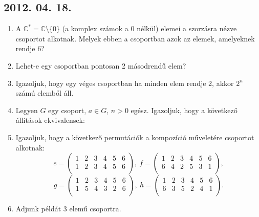 \subsection*{2012. 04. 18.}
\begin{enumerate}
\item A $\mathbb{C}^{*}=\mathbb{C}\setminus\{0\}$ (a komplex számok a 0 nélkül) elemei a szorzásra nézve csoportot alkotnak. Melyek ebben a csoportban azok az elemek, amelyeknek rendje 6?
\item Lehet-e egy csoportban pontosan 2 másodrendű elem?
\item Igazoljuk, hogy egy véges csoportban ha minden elem rendje 2, akkor $2^n$ számú elemből áll.
\item Legyen $G$ egy csoport, $a\in G$, $n>0$ egész. Igazoljuk, hogy a következő állítások ekvivalensek:
\item Igazoljuk, hogy a következő permutációk a kompozíció műveletére csoportot alkotnak:
\[e=\left(\begin{matrix}
1&2&3&4&5&6\\
1&2&3&4&5&6\\
\end{matrix}\right),~
f=\left(\begin{matrix}
1&2&3&4&5&6\\
6&4&2&5&3&1\\
\end{matrix}\right),\]
\[g=\left(\begin{matrix}
1&2&3&4&5&6\\
1&5&4&3&2&6\\
\end{matrix}\right),~
h=\left(\begin{matrix}
1&2&3&4&5&6\\
6&3&5&2&4&1\\
\end{matrix}\right).\]
\item Adjunk példát 3 elemű csoportra.
\end{enumerate}

